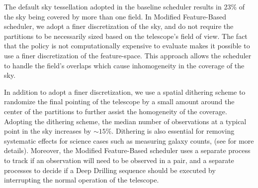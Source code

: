 \documentclass[12pt]{aastex62}
\theoremstyle{definition}
\begin{document}
The default sky tessellation adopted in the baseline scheduler results in 23\% of the sky being covered by more than one field. In Modified Feature-Based scheduler, we adopt a finer discretization of the sky, and do not require the partitions to be necessarily sized based on the telescope's field of view. The fact that the policy is not computationally expensive to evaluate makes it possible to use a finer discretization of the feature-space. This approach allows the scheduler to handle the field's overlaps which cause inhomogeneity in the coverage of the sky. 

In addition to adopt a finer discretization, we use a spatial dithering scheme to randomize the final pointing of the telescope by a small amount around the center of the partitions to further assist the homogeneity of the coverage. Adopting the dithering scheme, the median number of observations at a typical point in the sky increases by $\sim15$\%. Dithering is also essential for removing systematic effects for science cases such as measuring galaxy counts, (see \citep{Awan2016} for more details). Moreover, the Modified Feature-Based scheduler uses a separate process to track if an observation will need to be observed in a pair, and a separate processes to decide if a Deep Drilling sequence should be executed by interrupting the normal operation of the telescope.


%
\end{document}
